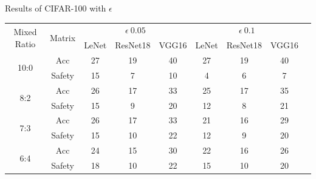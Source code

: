 \documentclass[journal,article,submit,moreauthors,pdftex]{Definitions/mdpi}
\begin{document}
\begin{specialtable}[H]
    \centering
    \caption{Results of CIFAR-100 with \begin{math}\epsilon\end{math}}
    \label{cifar100-results}
    {\small
    \begin{tabular}{|c|c|c|c|c|c|c|c|c|}
    \hline
    \multirow{2}{*}{Mixed Ratio} & \multirow{2}{*}{Matrix} & \multicolumn{3}{c|}{\begin{math}\epsilon \ 0.05\end{math}}  & \multicolumn{3}{c|}{\begin{math}\epsilon \ 0.1\end{math}}       \\ \cline{3-8}
                                 &                           & LeNet               & ResNet18              & VGG16       & LeNet              & ResNet18              & VGG16              \\ \hline 
    \multirow{2}{*}{10:0}        & Acc                       & 27                  & 19                    & 40          & 27                 & 19                    & 40                 \\ \cline{2-8} 
                                 & Safety                    & 15                  & 7                     & 10          & 4                  & 6                     & 7                  \\ \hline 
    \multirow{2}{*}{8:2}         & Acc                       & 26                  & 17                    & 33          & 25                 & 17                    & 35                 \\ \cline{2-8} 
                                 & Safety                    & 15                  & 9                     & 20          & 12                 & 8                     & 21                 \\ \hline 
    \multirow{2}{*}{7:3}         & Acc                       & 26                  & 17                    & 33          & 21                 & 16                    & 29                 \\ \cline{2-8} 
                                 & Safety                    & 15                  & 10                    & 22          & 12                 & 9                     & 20                 \\ \hline 
    \multirow{2}{*}{6:4}         & Acc                       & 24                  & 15                    & 30          & 22                 & 16                    & 26                 \\ \cline{2-8} 
                                 & Safety                    & 18                  & 10                    & 22          & 15                 & 10                    & 20                 \\ \hline 
    \end{tabular}
    }
\end{specialtable}
\end{document}
